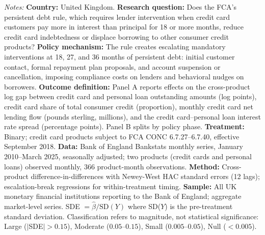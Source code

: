 \begin{table}[t]
\begin{threeparttable}
\begin{tablenotes}[flushleft]
\item \textit{Notes:} \textbf{Country:} United Kingdom. \textbf{Research question:} Does the FCA's persistent debt rule, which requires lender intervention when credit card customers pay more in interest than principal for 18 or more months, reduce credit card indebtedness or displace borrowing to other consumer credit products? \textbf{Policy mechanism:} The rule creates escalating mandatory interventions at 18, 27, and 36 months of persistent debt: initial customer contact, formal repayment plan proposals, and account suspension or cancellation, imposing compliance costs on lenders and behavioral nudges on borrowers. \textbf{Outcome definition:} Panel A reports effects on the cross-product log gap between credit card and personal loan outstanding amounts (log points), credit card share of total consumer credit (proportion), monthly credit card net lending flow (pounds sterling, millions), and the credit card--personal loan interest rate spread (percentage points). Panel B splits by policy phase. \textbf{Treatment:} Binary; credit card products subject to FCA CONC 6.7.27--6.7.40, effective September 2018. \textbf{Data:} Bank of England Bankstats monthly series, January 2010--March 2025, seasonally adjusted; two products (credit cards and personal loans) observed monthly, 366 product-month observations. \textbf{Method:} Cross-product difference-in-differences with Newey-West HAC standard errors (12 lags); escalation-break regressions for within-treatment timing. \textbf{Sample:} All UK monetary financial institutions reporting to the Bank of England; aggregate market-level series. SDE $= \hat{\beta} / \text{SD}(Y)$ where SD($Y$) is the pre-treatment standard deviation. Classification refers to magnitude, not statistical significance: Large ($|$SDE$| > 0.15$), Moderate ($0.05$--$0.15$), Small ($0.005$--$0.05$), Null ($< 0.005$).
\end{tablenotes}
\end{threeparttable}
\end{table}

